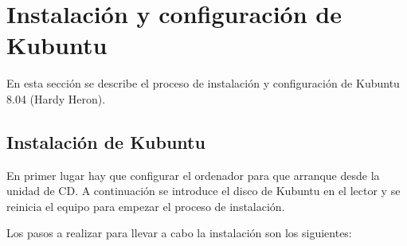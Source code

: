 \section{Instalación y configuración de Kubuntu}
\label{instKubuntu}

En esta sección se describe el proceso de instalación y configuración de Kubuntu 8.04 (Hardy Heron).

\subsection{Instalación de Kubuntu}

En primer lugar hay que configurar el ordenador para que arranque desde la unidad de CD. A continuación se introduce el disco de Kubuntu en el lector y se reinicia el equipo para empezar el proceso de instalación.

Los pasos a realizar para llevar a cabo la instalación son los siguientes:

